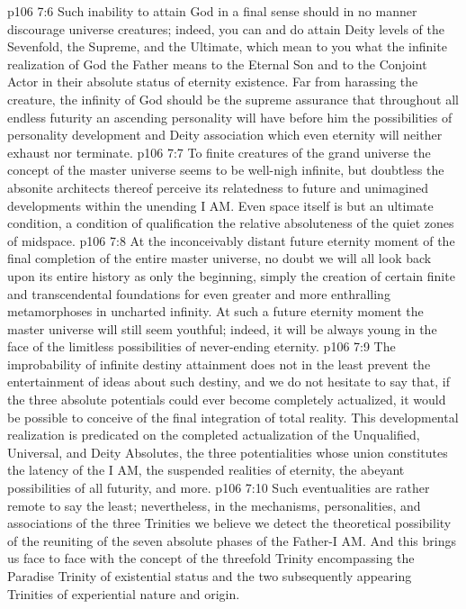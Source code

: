 \vs p106 7:6 Such inability to attain God in a final sense should in no manner discourage universe creatures; indeed, you can and do attain Deity levels of the Sevenfold, the Supreme, and the Ultimate, which mean to you what the infinite realization of God the Father means to the Eternal Son and to the Conjoint Actor in their absolute status of eternity existence. Far from harassing the creature, the infinity of God should be the supreme assurance that throughout all endless futurity an ascending personality will have before him the possibilities of personality development and Deity association which even eternity will neither exhaust nor terminate.
\vs p106 7:7 \pc To finite creatures of the grand universe the concept of the master universe seems to be well\hyp{}nigh infinite, but doubtless the absonite architects thereof perceive its relatedness to future and unimagined developments within the unending I AM. Even space itself is but an ultimate condition, a condition of qualification  the relative absoluteness of the quiet zones of midspace.
\vs p106 7:8 At the inconceivably distant future eternity moment of the final completion of the entire master universe, no doubt we will all look back upon its entire history as only the beginning, simply the creation of certain finite and transcendental foundations for even greater and more enthralling metamorphoses in uncharted infinity. At such a future eternity moment the master universe will still seem youthful; indeed, it will be always young in the face of the limitless possibilities of never\hyp{}ending eternity.
\vs p106 7:9 \pc The improbability of infinite destiny attainment does not in the least prevent the entertainment of ideas about such destiny, and we do not hesitate to say that, if the three absolute potentials could ever become completely actualized, it would be possible to conceive of the final integration of total reality. This developmental realization is predicated on the completed actualization of the Unqualified, Universal, and Deity Absolutes, the three potentialities whose union constitutes the latency of the I AM, the suspended realities of eternity, the abeyant possibilities of all futurity, and more.
\vs p106 7:10 Such eventualities are rather remote to say the least; nevertheless, in the mechanisms, personalities, and associations of the three Trinities we believe we detect the theoretical possibility of the reuniting of the seven absolute phases of the Father\hyp{}I AM. And this brings us face to face with the concept of the threefold Trinity encompassing the Paradise Trinity of existential status and the two subsequently appearing Trinities of experiential nature and origin.
